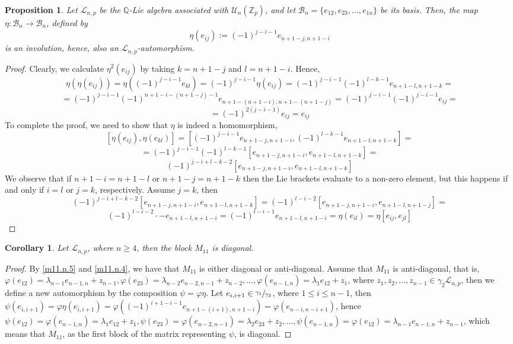 \documentclass[12pt]{article}
\newtheorem{proposition}[theorem]{Proposition}
\newtheorem{corollary}[theorem]{Corollary}
\begin{document}
\begin{proposition}
\label{prop.involution}
Let $\mathcal{L}_{n,p}$ be the $\mathbb{Q}$-Lie algebra associated with $\mathcal{U}_n(\mathbb{Z}_p)$, and let $\mathcal{B}_n=\{e_{12},e_{23},\dots,e_{1n}\}$ be its basis. Then, the map $\eta:\mathcal{B}_n\rightarrow \mathcal{B}_n$, defined by \[\eta(e_{ij}):=(-1)^{j-i-1}e_{n+1-j,n+1-i}\] is an involution, hence, also an $\mathcal{L}_{n,p}$-automorphism.
\end{proposition}
\begin{proof}
Clearly, we calculate $\eta^2(e_{ij})$ by taking $k=n+1-j$ and $l=n+1-i$. Hence, \[\eta(\eta(e_{ij}))=\eta((-1)^{j-i-1}e_{kl})=(-1)^{j-i-1}\eta(e_{ij})=(-1)^{j-i-1}(-1)^{l-k-1}e_{n+1-l,n+1-k}=\]\[=(-1)^{j-i-1}(-1)^{n+1-i-(n+1-j)-1}e_{n+1-(n+1-i),n+1-(n+1-j)}=(-1)^{j-i-1}(-1)^{j-i-1}e_{ij}=\]\[=(-1)^{2(j-i-1)}e_{ij}=e_{ij}\]
To complete the proof, we need to show that $\eta$ is indeed a homomorphism,
\[[\eta(e_{ij}),\eta(e_{kl})]=[(-1)^{j-i-1}e_{n+1-j,n+1-i},(-1)^{l-k-1}e_{n+1-l,n+1-k}]=\]\[=(-1)^{j-i-1}(-1)^{l-k-1}[e_{n+1-j,n+1-i},e_{n+1-l,n+1-k}]=\]\[(-1)^{j-i+l-k-2}[e_{n+1-j,n+1-i},e_{n+1-l,n+1-k}]\]
We observe that if $n+1-i=n+1-l$ or $n+1-j=n+1-k$ then the Lie brackets evaluate to a non-zero element, but this happens if and only if $i=l$ or $j=k$, respectively. Assume $j=k$, then \[(-1)^{j-i+l-k-2}[e_{n+1-j,n+1-i},e_{n+1-l,n+1-k}]=(-1)^{l-i-2}[e_{n+1-j,n+1-i},e_{n+1-l,n+1-j}]=\]\[(-1)^{l-i-2}\cdot-e_{n+1-l,n+1-i}=(-1)^{l-i-1}e_{n+1-l,n+1-i}=\eta(e_{il})=\eta[e_{ij},e_{jl}]\] 
\end{proof}
\begin{corollary}
\label{m11.diagonal}
Let $\mathcal{L}_{n,p}$, where $n\geq 4$, then the block $M_{11}$ is diagonal.
\end{corollary}
\begin{proof}
By \ref{m11.n.5} and \ref{m11.n.4}, we have that $M_{11}$ is either diagonal or anti-diagonal. Assume that $M_{11}$ is anti-diagonal, that is, $\varphi(e_{12})=\lambda_{n-1}e_{n-1,n}+z_{n-1},\varphi(e_{23})=\lambda_{n-2} e_{n-2,n-1}+z_{n-2},\dots,\varphi(e_{n-1,n})=\lambda_1 e_{12}+z_1$, where $z_1,z_2,\dots,z_{n-1}\in\gamma_2\mathcal{L}_{n,p}$, then we define a new automorphism by the composition $\psi=\varphi\eta$. Let $e_{i,i+1}\in\sfrac{\gamma_1}{\gamma_2}$, where $1\leq i\leq n-1$, then $\psi(e_{i,i+1})=\varphi\eta(e_{i,i+1})=\varphi((-1)^{i+1-i-1}e_{n+1-(i+1),n+1-i})=\varphi(e_{n-i,n-i+1})
$, hence $\psi(e_{12})=\varphi(e_{n-1,n})=\lambda_1 e_{12}+z_1,\psi(e_{23})=\varphi(e_{n-2,n-1})=\lambda_2 e_{23}+z_2,\dots,\psi(e_{n-1,n})=\varphi(e_{12})=\lambda_{n-1}e_{n-1,n}+z_{n-1}$, which means that $M_{11}$, as the first block of the matrix representing $\psi$, is diagonal.  
\end{proof}
\end{document}
